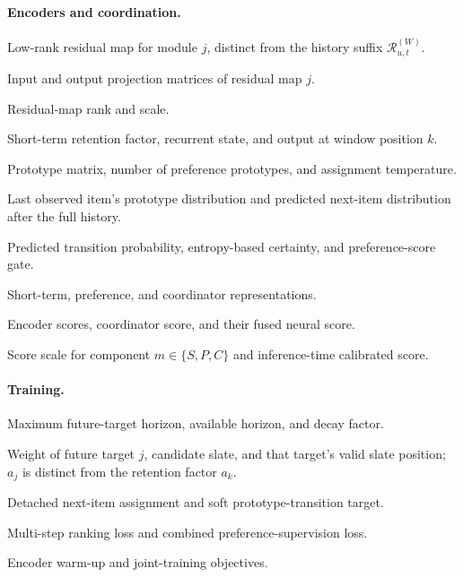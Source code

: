 \documentclass[11pt]{article}
\begin{document}
\paragraph{Encoders and coordination.}
\begin{description}[leftmargin=2.4cm,labelwidth=2.1cm,itemsep=0pt]
\item[$\mathcal R_j$] Low-rank residual map for module $j$, distinct from the history suffix $\mathcal R_{u,t}^{(W)}$.
\item[$A_j,B_j$] Input and output projection matrices of residual map $j$.
\item[$r,\alpha_{\mathrm{LoRA}}$] Residual-map rank and scale.
\item[$a_k,h_k,o_k$] Short-term retention factor, recurrent state, and output at window position $k$.
\item[$C,M,\tau_p$] Prototype matrix, number of preference prototypes, and assignment temperature.
\item[$q_t,\widehat q_{t+1}$] Last observed item's prototype distribution and predicted next-item distribution after the full history.
\item[$\rho_t,c_t,\gamma_u$] Predicted transition probability, entropy-based certainty, and preference-score gate.
\item[$s_S,s_P,s_C$] Short-term, preference, and coordinator representations.
\item[$z_S,z_P,z_C,z$] Encoder scores, coordinator score, and their fused neural score.
\item[$\kappa_m,\widetilde z$] Score scale for component $m\in\{S,P,C\}$ and inference-time calibrated score.
\end{description}

\paragraph{Training.}
\begin{description}[leftmargin=2.4cm,labelwidth=2.1cm,itemsep=0pt]
\item[$F,F',\eta$] Maximum future-target horizon, available horizon, and decay factor.
\item[$a_j,\mathcal S,p_j$] Weight of future target $j$, candidate slate, and that target's valid slate position; $a_j$ is distinct from the retention factor $a_k$.
\item[$q^+,y_{\mathrm{shift}}$] Detached next-item assignment and soft prototype-transition target.
\item[$\mathcal L_{\mathrm{rank}},\mathcal L_P$] Multi-step ranking loss and combined preference-supervision loss.
\item[$\mathcal L_{\mathrm{warm}},\mathcal L_{\mathrm{joint}}$] Encoder warm-up and joint-training objectives.
\end{description}
\end{document}
